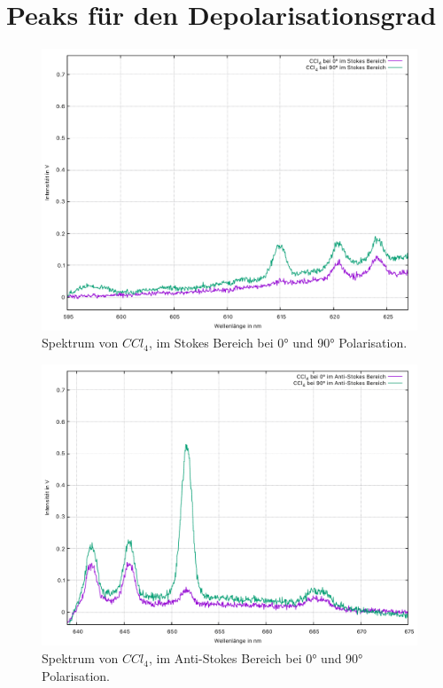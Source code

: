 \chapter{Peaks für den Depolarisationsgrad}
\begin{figure}[h]
  \centering
  \includegraphics[scale=0.45]{Bilder/Verbesserung_Auswertung/ccl4_stokes.pdf}
  \caption{Spektrum von $CCl_4$, im Stokes Bereich bei 0° und 90° Polarisation.}
\end{figure}
\begin{figure}[h]
  \centering
  \includegraphics[scale=0.45]{Bilder/Verbesserung_Auswertung/ccl4_anti.pdf}
  \caption{Spektrum von $CCl_4$, im Anti-Stokes Bereich bei 0° und 90° Polarisation.}
\end{figure}
